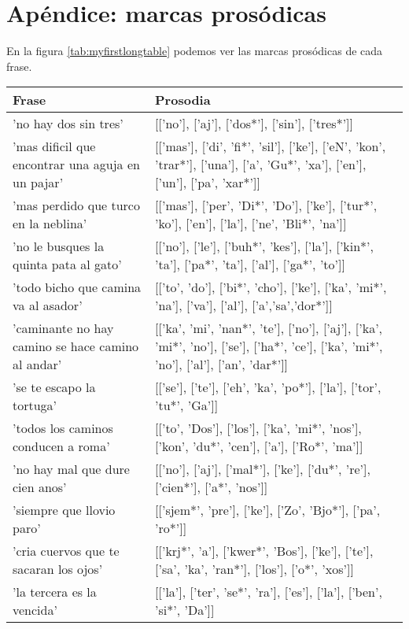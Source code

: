 \chapter*{Apéndice: marcas prosódicas}

En la figura \ref{tab:myfirstlongtable} podemos ver las marcas prosódicas de cada frase.

\centering
\begin{longtable}{| p{} | p{} |} 
\hline
\textbf{Frase}  & \textbf{Prosodia}  \\ \hline

'no hay dos sin tres' & [['no'], ['aj'], ['dos*'], ['sin'], ['tres*']] \\ \hline
'mas dificil que encontrar una aguja en un pajar' & [['mas'], ['di', 'fi*', 'sil'], ['ke'], ['eN', 'kon', 'trar*'], ['una'], ['a', 'Gu*', 'xa'], ['en'], ['un'], ['pa', 'xar*']] \\ \hline
'mas perdido que turco en la neblina' & [['mas'], ['per', 'Di*', 'Do'], ['ke'], ['tur*', 'ko'], ['en'], ['la'], ['ne', 'Bli*', 'na']] \\ \hline
'no le busques la quinta pata al gato' & [['no'], ['le'], ['buh*', 'kes'], ['la'], ['kin*', 'ta'], ['pa*', 'ta'], ['al'], ['ga*', 'to']] \\ \hline
'todo bicho que camina va al asador' & [['to', 'do'], ['bi*', 'cho'], ['ke'], ['ka', 'mi*', 'na'], ['va'], ['al'], ['a','sa','dor*']] \\ \hline
'caminante no hay camino se hace camino al andar' & [['ka', 'mi', 'nan*', 'te'], ['no'], ['aj'], ['ka', 'mi*', 'no'], ['se'], ['ha*', 'ce'], ['ka', 'mi*', 'no'], ['al'], ['an', 'dar*']] \\ \hline
'se te escapo la tortuga' & [['se'], ['te'], ['eh', 'ka', 'po*'], ['la'], ['tor', 'tu*', 'Ga']] \\ \hline
'todos los caminos conducen a roma' & [['to', 'Dos'], ['los'], ['ka', 'mi*', 'nos'], ['kon', 'du*', 'cen'], ['a'], ['Ro*', 'ma']] \\ \hline
'no hay mal que dure cien anos' & [['no'], ['aj'], ['mal*'], ['ke'], ['du*', 're'], ['cien*'], ['a*', 'nos']] \\ \hline
'siempre que llovio paro' & [['sjem*', 'pre'], ['ke'], ['Zo', 'Bjo*'], ['pa', 'ro*']] \\ \hline
'cria cuervos que te sacaran los ojos' & [['krj*', 'a'], ['kwer*', 'Bos'], ['ke'], ['te'], ['sa', 'ka', 'ran*'], ['los'], ['o*', 'xos']] \\ \hline
'la tercera es la vencida' & [['la'], ['ter', 'se*', 'ra'], ['es'], ['la'], ['ben', 'si*', 'Da']] \\ \hline

\end{longtable}

